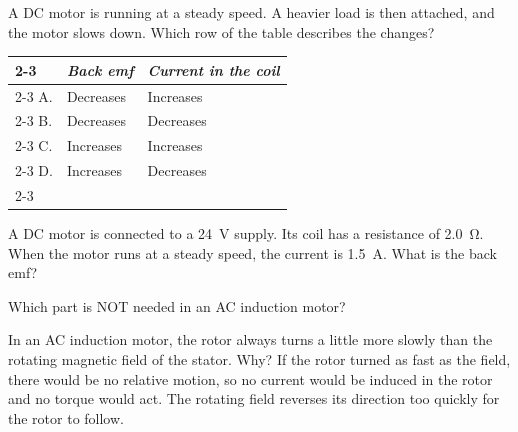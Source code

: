 \begin{quizq}{}
A DC motor is running at a steady speed. A heavier load is then attached, and the motor slows down.
Which row of the table describes the changes?
\begin{center}
  \renewcommand\arraystretch{1.7}
  \begin{tabular}{@{}p{10mm}|>{\centering\arraybackslash}p{50mm}|>{\centering\arraybackslash}p{50mm}|}
    \cline{2-3}
    & \textit{Back emf} & \textit{Current in the coil}\\ \cline{2-3}
    A. & Decreases & Increases\\ \cline{2-3}
    B. & Decreases & Decreases\\ \cline{2-3}
    C. & Increases & Increases\\ \cline{2-3}
    D. & Increases & Decreases\\ \cline{2-3}
  \end{tabular}
\end{center}
\end{quizq}

\begin{quizq}{}
A DC motor is connected to a \qty{24}{V} supply. Its coil has a resistance of \qty{2.0}{\ohm}. When the
motor runs at a steady speed, the current is \qty{1.5}{A}. What is the back emf?
\end{quizq}

\begin{quizq}{}
Which part is NOT needed in an AC induction motor?
\end{quizq}

\begin{quizq}{}
In an AC induction motor, the rotor always turns a little more slowly than the rotating magnetic
field of the stator. Why?
  {If the rotor turned as fast as the field, there would be no relative motion, so no current would be
   induced in the rotor and no torque would act.}
  {The rotating field reverses its direction too quickly for the rotor to follow.}
\end{quizq}

